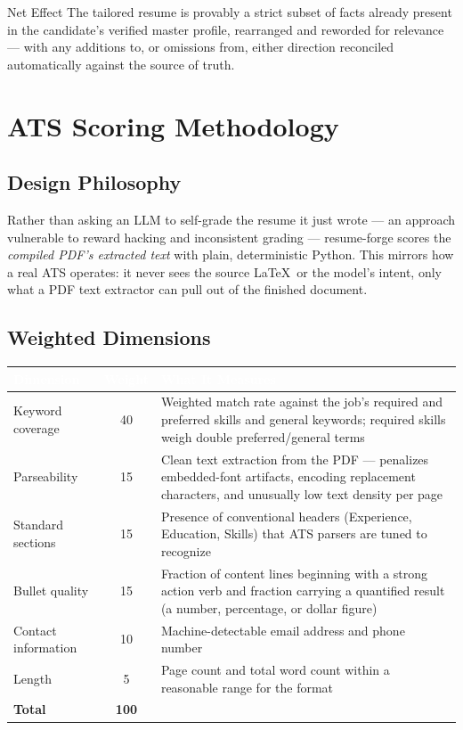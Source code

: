 \documentclass[10.5pt,letterpaper]{article}
\begin{document}
\begin{statbox}{Net Effect}
The tailored resume is provably a strict subset of facts already present in the candidate's
verified master profile, rearranged and reworded for relevance --- with any additions to,
or omissions from, either direction reconciled automatically against the source of truth.
\end{statbox}

\newpage

\section{ATS Scoring Methodology}

\subsection{Design Philosophy}
Rather than asking an LLM to self-grade the resume it just wrote --- an approach vulnerable
to reward hacking and inconsistent grading --- resume-forge scores the \emph{compiled PDF's
extracted text} with plain, deterministic Python. This mirrors how a real ATS operates: it
never sees the source \LaTeX\ or the model's intent, only what a PDF text extractor can pull
out of the finished document.

\subsection{Weighted Dimensions}
\begin{tabularx}{\textwidth}{@{}l c X@{}}
\toprule
\rowcolor{brandIndigoDark}
\textcolor{white}{\textbf{Dimension}} & \textcolor{white}{\textbf{Weight}} &
\textcolor{white}{\textbf{What It Measures}} \\
\midrule
Keyword coverage & 40 & Weighted match rate against the job's required and preferred
  skills and general keywords; required skills weigh double preferred/general terms \\
\rowcolor{brandBgGray}
Parseability & 15 & Clean text extraction from the PDF --- penalizes embedded-font
  artifacts, encoding replacement characters, and unusually low text density per page \\
Standard sections & 15 & Presence of conventional headers (Experience, Education, Skills)
  that ATS parsers are tuned to recognize \\
\rowcolor{brandBgGray}
Bullet quality & 15 & Fraction of content lines beginning with a strong action verb and
  fraction carrying a quantified result (a number, percentage, or dollar figure) \\
Contact information & 10 & Machine-detectable email address and phone number \\
\rowcolor{brandBgGray}
Length & 5 & Page count and total word count within a reasonable range for the format \\
\midrule
\textbf{Total} & \textbf{100} & \\
\bottomrule
\end{tabularx}
\end{document}
